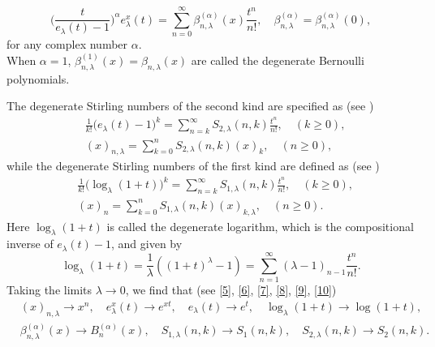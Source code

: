 \documentclass[a4paper,11pt]{amsart}
\begin{document}
\begin{equation} \label{7}
\Big(\frac{t}{e_{\lambda}(t)-1}\Big)^{\alpha}e_{\lambda}^{x}(t)=\sum_{n=0}^{\infty}\beta_{n,\lambda}^{(\alpha)}(x)\frac{t^{n}}{n!},\quad \beta_{n,\lambda}^{(\alpha)}=\beta_{n,\lambda}^{(\alpha)}(0),
\end{equation}
for any complex number $\alpha$. \\
When $\alpha=1$, $\beta_{n, \lambda}^{(1)}(x)=\beta_{n, \lambda}(x)$ are called the degenerate Bernoulli polynomials. \par
The degenerate Stirling numbers of the second kind are specified as (see \cite{14,20})
\begin{equation} \label{8}
\begin{aligned}
&\frac{1}{k!}\big(e_{\lambda}(t)-1 \big)^{k}=\sum_{n=k}^{\infty}S_{2,\lambda}(n,k)\frac{t^{n}}{n!},\quad (k \ge 0), \\
&(x)_{n,\lambda}=\sum_{k=0}^{n}S_{2,\lambda}(n,k)(x)_{k},\quad(n \ge 0),
\end{aligned}
\end{equation}
while the degenerate Stirling numbers of the first kind are defined as (see \cite{12,20})
\begin{equation} \label{9}
\begin{aligned}
&\frac{1}{k!}\big(\log_{\lambda}(1+t)\big)^{k}=\sum_{n=k}^{\infty}S_{1,\lambda}(n,k)\frac{t^{n}}{n!}, \quad (k \ge 0),\\
&(x)_{n}=\sum_{k=0}^{n}S_{1,\lambda}(n,k)(x)_{k,\lambda},\quad (n \ge 0).
\end{aligned}
\end{equation}
Here $\log_{\lambda}(1+t)$ is called the degenerate logarithm, which is the compositional inverse of $e_{\lambda}(t)-1$, and given by
\begin{equation} \label{10}
\log_{\lambda}(1+t)=\frac{1}{\lambda}((1+t)^{\lambda}-1)=\sum_{n=1}^{\infty}(\lambda-1)_{n-1}\frac{t^{n}}{n!}.
\end{equation}
Taking the limits $\lambda \rightarrow 0$, we find that (see \eqref{5}, \eqref{6}, \eqref{7}, \eqref{8}, \eqref{9}, \eqref{10})
\begin{align*}
&(x)_{n,\lambda} \rightarrow x^{n}, \quad e_{\lambda}^{x}(t) \rightarrow e^{xt}, \quad e_{\lambda}(t) \rightarrow e^{t},\quad \log_{\lambda}(1+t) \rightarrow \log (1+t), \\
&\beta_{n,\lambda}^{(\alpha)}(x) \rightarrow B_{n}^{(\alpha)}(x), \quad S_{1,\lambda}(n,k) \rightarrow S_{1}(n,k), \quad 
S_{2,\lambda}(n,k) \rightarrow S_{2}(n,k).
\end{align*} \par
\end{document}
